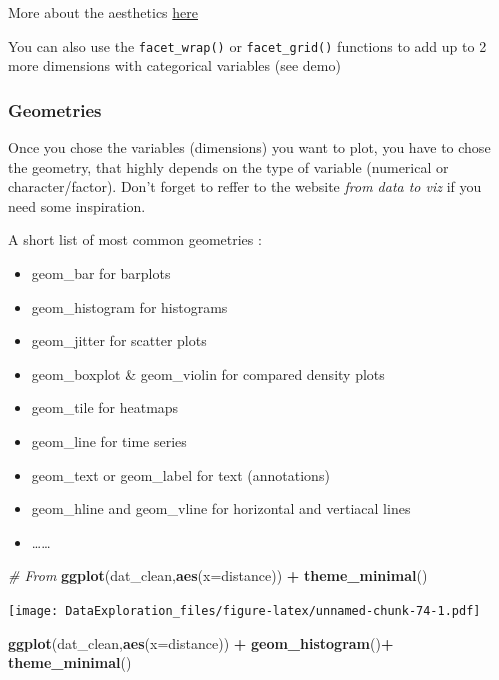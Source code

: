 \documentclass[
]{book}
\newenvironment{Shaded}{\begin{snugshade}}{\end{snugshade}}
\newcommand{\CommentTok}[1]{\textcolor[rgb]{0.56,0.35,0.01}{\textit{#1}}}
\newcommand{\DataTypeTok}[1]{\textcolor[rgb]{0.13,0.29,0.53}{#1}}
\newcommand{\KeywordTok}[1]{\textcolor[rgb]{0.13,0.29,0.53}{\textbf{#1}}}
\newcommand{\NormalTok}[1]{#1}
\newcommand{\OperatorTok}[1]{\textcolor[rgb]{0.81,0.36,0.00}{\textbf{#1}}}
\newcommand{\StringTok}[1]{\textcolor[rgb]{0.31,0.60,0.02}{#1}}
\providecommand{\tightlist}{%
  \setlength{\itemsep}{0pt}\setlength{\parskip}{0pt}}
\begin{document}
More about the aesthetics \href{https://ggplot2.tidyverse.org/articles/ggplot2-specs.html}{here}

You can also use the \texttt{facet\_wrap()} or \texttt{facet\_grid()} functions to add up to 2 more dimensions with categorical variables (see demo)

\hypertarget{geometries}{%
\subsubsection{Geometries}\label{geometries}}

Once you chose the variables (dimensions) you want to plot, you have to chose the geometry, that highly depends on the type of variable (numerical or character/factor). Don't forget to reffer to the website \emph{from data to viz} if you need some inspiration.

A short list of most common geometries :

\begin{itemize}
\tightlist
\item
  geom\_bar for barplots
\item
  geom\_histogram for histograms
\item
  geom\_jitter for scatter plots
\item
  geom\_boxplot \& geom\_violin for compared density plots
\item
  geom\_tile for heatmaps
\item
  geom\_line for time series
\item
  geom\_text or geom\_label for text (annotations)
\item
  geom\_hline and geom\_vline for horizontal and vertiacal lines
\item
  \ldots\ldots{}
\end{itemize}

\begin{Shaded}
\begin{Highlighting}[]
\CommentTok{# From }
\KeywordTok{ggplot}\NormalTok{(dat_clean,}\KeywordTok{aes}\NormalTok{(}\DataTypeTok{x=}\NormalTok{distance)) }\OperatorTok{+}
\StringTok{  }\KeywordTok{theme_minimal}\NormalTok{()}
\end{Highlighting}
\end{Shaded}

\texttt{[image: DataExploration\_files/figure-latex/unnamed-chunk-74-1.pdf]}

\begin{Shaded}
\begin{Highlighting}[]
\KeywordTok{ggplot}\NormalTok{(dat_clean,}\KeywordTok{aes}\NormalTok{(}\DataTypeTok{x=}\NormalTok{distance)) }\OperatorTok{+}\StringTok{ }\KeywordTok{geom_histogram}\NormalTok{()}\OperatorTok{+}
\StringTok{  }\KeywordTok{theme_minimal}\NormalTok{()}
\end{Highlighting}
\end{Shaded}
\end{document}
